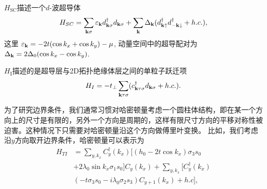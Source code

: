 \qquad $H_\mathrm{SC}$描述一个$d$-波超导体
\begin{equation}
H_{SC}=\sum_{{\bf k}\sigma}\varepsilon_{\bf k}d^\dagger_{{\bf k}\sigma}d_{{\bf k}\sigma}+\sum_{{\bf k}}\Delta_{\bf k}(d^\dagger_{{\bf k}\uparrow}d^\dagger_{{-\bf k}\downarrow}+h.c.),
\end{equation}
这里 $\varepsilon_{\bf k}=-2t(\cos k_x+\cos k_y)-\mu$, 动量空间中的超导配对为 $\Delta_{\bf k}=2\Delta_0 (\cos k_x-\cos k_y)$.

\qquad $H_\mathrm{I}$描述的是超导层与2D拓扑绝缘体层之间的单粒子跃迁项
\begin{equation}
H_{I}=-t_\perp \sum_{{\bf k}\tau\sigma}(c_{{\bf k}\tau\sigma}^\dagger d_{{\bf k}\sigma}+h.c.).
\end{equation}

\qquad 为了研究边界条件，我们通常习惯对哈密顿量考虑一个圆柱体结构，即在某一个方向上的尺寸是有限的，另外一个方向是周期的，这样有限尺寸方向的平移对称性被迫害。这种情况下只需要对哈密顿量沿这个方向做傅里叶变换。 比如，我们考虑沿$y$方向取开边界条件，哈密顿量可以表示为
\begin{equation}
	\begin{aligned}
		H_{TI} &= \sum_{y,k_x}C^\dagger_{y}(k_x)[(h_0-2t\cos k_x)\sigma_3s_0 \\&+2\lambda_0\sin k_x\sigma_1s_0]C_{y}(k_x)
		+\sum_{y,k_x}[C^\dagger_{y}(k_x)\\&(-t\sigma_3s_0-i\lambda_0\sigma_2s_3)C_{y+1}(k_x)+h.c],
	\end{aligned}
\end{equation}

